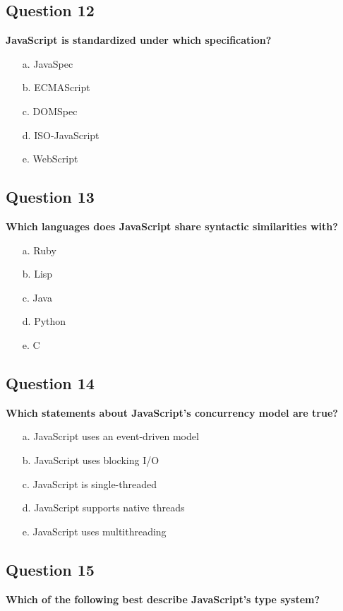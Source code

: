 \documentclass{article}
\begin{document}
\subsection*{Question 12}
\textbf{JavaScript is standardized under which specification?}

\begin{itemize}
  \item[a.] JavaSpec
  \item[b.] ECMAScript
  \item[c.] DOMSpec
  \item[d.] ISO-JavaScript
  \item[e.] WebScript
\end{itemize}

\subsection*{Question 13}
\textbf{Which languages does JavaScript share syntactic similarities with?}

\begin{itemize}
  \item[a.] Ruby
  \item[b.] Lisp
  \item[c.] Java
  \item[d.] Python
  \item[e.] C
\end{itemize}

\subsection*{Question 14}
\textbf{Which statements about JavaScript's concurrency model are true?}

\begin{itemize}
  \item[a.] JavaScript uses an event-driven model
  \item[b.] JavaScript uses blocking I/O
  \item[c.] JavaScript is single-threaded
  \item[d.] JavaScript supports native threads
  \item[e.] JavaScript uses multithreading
\end{itemize}

\subsection*{Question 15}
\textbf{Which of the following best describe JavaScript's type system?}
\end{document}

